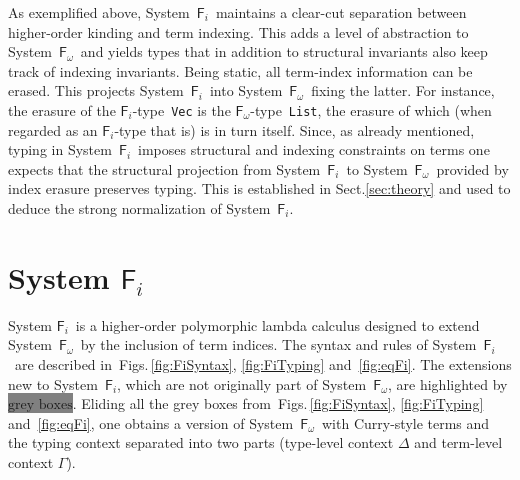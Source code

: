 \documentclass{llncs}
\newcommand{\Figs}[1]{Figs.\,\ref{fig:#1}}
\newcommand{\newFi}[1]{\colorbox{grey}{\ensuremath{#1}}}
\newcommand{\Fi}{\ensuremath{\mathsf{F}_i}}
\newcommand{\Fw}{\ensuremath{\mathsf{F}_\omega}}
\renewcommand{\S}[0]{Sect.\;}
\begin{document}
As exemplified above, System~\Fi\ maintains a clear-cut separation between
higher-order kinding and term indexing.  This adds a level of abstraction
to System~\Fw\ and yields types that in addition to structural invariants
also keep track of indexing invariants.  Being static, all term-index
information can be erased.  This projects System~\Fi\ into System~\Fw\
fixing the latter.  For instance, the erasure of the \Fi-type~\texttt{Vec}
is the \Fw-type~\texttt{List}, the erasure of which (when regarded as an
\Fi-type that is) is in turn itself.  Since, as already mentioned, typing
in System~\Fi\ imposes structural and indexing constraints on terms one
expects that the structural projection from System~\Fi\ to System~\Fw\
provided by index erasure preserves typing.  This is established in
\S\ref{sec:theory} and used to deduce the strong normalization of
System~\Fi.

\section{System \Fi} \label{sec:Fi}
System \Fi\ is a higher-order polymorphic lambda calculus 
designed to extend System~\Fw\ by the inclusion of term indices.
The syntax and rules of System~\Fi\ are described in~\Figs{FiSyntax},
\ref{fig:FiTyping} and~\ref{fig:eqFi}. 
The extensions new to System~\Fi, which are not originally part of System~\Fw, 
are highlighted by \newFi{\text{grey boxes}}.
Eliding all the grey boxes from~\Figs{FiSyntax}, \ref{fig:FiTyping}
and~\ref{fig:eqFi}, one obtains a version of System~\Fw\ 
with Curry-style terms and the typing context separated into two parts
(type-level context $\Delta$ and term-level context $\Gamma$).
\end{document}
